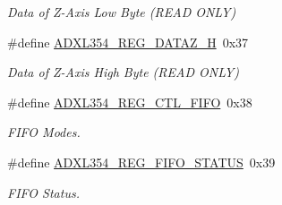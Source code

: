 \begin{DoxyCompactItemize}
\begin{DoxyCompactList}\small\item\em \-Data of \-Z-\/\-Axis \-Low \-Byte (\-R\-E\-A\-D \-O\-N\-L\-Y) \end{DoxyCompactList}\item 
\hypertarget{group___a_d_x_l354___r_e_g_i_s_t_e_r_s_ga525a5152ed6f7d5c70001e9082fde705}{\#define \hyperlink{group___a_d_x_l354___r_e_g_i_s_t_e_r_s_ga525a5152ed6f7d5c70001e9082fde705}{\-A\-D\-X\-L354\-\_\-\-R\-E\-G\-\_\-\-D\-A\-T\-A\-Z\-\_\-\-H}~0x37}\label{group___a_d_x_l354___r_e_g_i_s_t_e_r_s_ga525a5152ed6f7d5c70001e9082fde705}

\begin{DoxyCompactList}\small\item\em \-Data of \-Z-\/\-Axis \-High \-Byte (\-R\-E\-A\-D \-O\-N\-L\-Y) \end{DoxyCompactList}\item 
\hypertarget{group___a_d_x_l354___r_e_g_i_s_t_e_r_s_ga58e362923aea0acd7420c4a6646a6af8}{\#define \hyperlink{group___a_d_x_l354___r_e_g_i_s_t_e_r_s_ga58e362923aea0acd7420c4a6646a6af8}{\-A\-D\-X\-L354\-\_\-\-R\-E\-G\-\_\-\-C\-T\-L\-\_\-\-F\-I\-F\-O}~0x38}\label{group___a_d_x_l354___r_e_g_i_s_t_e_r_s_ga58e362923aea0acd7420c4a6646a6af8}

\begin{DoxyCompactList}\small\item\em \-F\-I\-F\-O \-Modes. \end{DoxyCompactList}\item 
\hypertarget{group___a_d_x_l354___r_e_g_i_s_t_e_r_s_gaec3218603707dfc9f7bbf6fa508a1aba}{\#define \hyperlink{group___a_d_x_l354___r_e_g_i_s_t_e_r_s_gaec3218603707dfc9f7bbf6fa508a1aba}{\-A\-D\-X\-L354\-\_\-\-R\-E\-G\-\_\-\-F\-I\-F\-O\-\_\-\-S\-T\-A\-T\-U\-S}~0x39}\label{group___a_d_x_l354___r_e_g_i_s_t_e_r_s_gaec3218603707dfc9f7bbf6fa508a1aba}

\begin{DoxyCompactList}\small\item\em \-F\-I\-F\-O \-Status. \end{DoxyCompactList}\end{DoxyCompactItemize}
